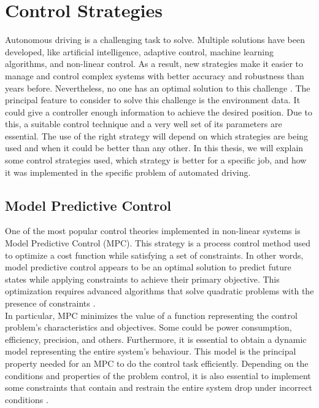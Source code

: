 \section{Control Strategies}
Autonomous driving is a challenging task to solve. Multiple solutions have been developed, like artificial intelligence, adaptive control, machine learning algorithms, and non-linear control. As a result, new strategies make it easier to manage and control complex systems with better accuracy and robustness than years before. Nevertheless, no one has an optimal solution to this challenge \cite{506394}. The principal feature to consider to solve this challenge is the environment data. It could give a controller enough information to achieve the desired position. Due to this, a suitable control technique and a very well set of its parameters are essential. The use of the right strategy will depend on which strategies are being used and when it could be better than any other. In this thesis, we will explain some control strategies used, which strategy is better for a specific job, and how it was implemented in the specific problem of automated driving.


\subsection{Model Predictive Control}
One of the most popular control theories implemented in non-linear systems is Model Predictive Control (MPC). This strategy is a process control method used to optimize a cost function while satisfying a set of constraints. In other words, model predictive control appears to be an optimal solution to predict future states while applying constraints to achieve their primary objective. This optimization requires advanced algorithms that solve quadratic problems with the presence of constraints \cite{GARCIA1989335}.
\\

In particular, MPC minimizes the value of a function representing the control problem's characteristics and objectives. Some could be power consumption, efficiency, precision, and others. Furthermore, it is essential to obtain a dynamic model representing the entire system's behaviour. This model is the principal property needed for an MPC to do the control task efficiently. Depending on the conditions and properties of the problem control, it is also essential to implement some constraints that contain and restrain the entire system drop under incorrect conditions \cite{MAYNE2000789}.\\



